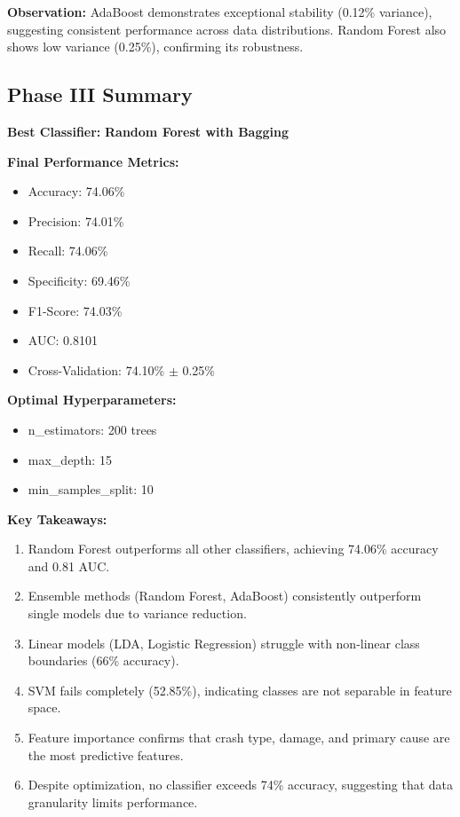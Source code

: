 \documentclass[12pt,man]{apa7}
\begin{document}
\textbf{Observation:} AdaBoost demonstrates exceptional stability (0.12\% variance), suggesting consistent performance across data distributions. Random Forest also shows low variance (0.25\%), confirming its robustness.

\subsection{Phase III Summary}

\textbf{Best Classifier:} \textbf{Random Forest with Bagging}

\textbf{Final Performance Metrics:}
\begin{itemize}
    \item Accuracy: 74.06\%
    \item Precision: 74.01\%
    \item Recall: 74.06\%
    \item Specificity: 69.46\%
    \item F1-Score: 74.03\%
    \item AUC: 0.8101
    \item Cross-Validation: 74.10\% $\pm$ 0.25\%
\end{itemize}

\textbf{Optimal Hyperparameters:}
\begin{itemize}
    \item n\_estimators: 200 trees
    \item max\_depth: 15
    \item min\_samples\_split: 10
\end{itemize}

\textbf{Key Takeaways:}
\begin{enumerate}
    \item Random Forest outperforms all other classifiers, achieving 74.06\% accuracy and 0.81 AUC.
    \item Ensemble methods (Random Forest, AdaBoost) consistently outperform single models due to variance reduction.
    \item Linear models (LDA, Logistic Regression) struggle with non-linear class boundaries (66\% accuracy).
    \item SVM fails completely (52.85\%), indicating classes are not separable in feature space.
    \item Feature importance confirms that crash type, damage, and primary cause are the most predictive features.
    \item Despite optimization, no classifier exceeds 74\% accuracy, suggesting that data granularity limits performance.
\end{enumerate}
\end{document}
